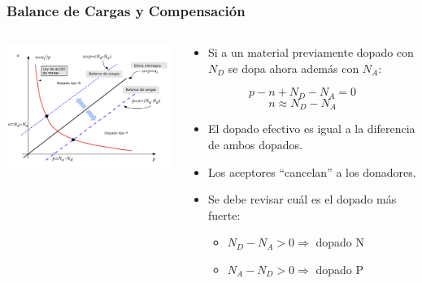 \documentclass[10pt,t,aspectratio=169]{beamer}
\begin{document}
\begin{frame}[t]
  \frametitle{Balance de Cargas y Compensación}

  \begin{columns}
    \begin{column}{0.6\textwidth}
      \includegraphics[width=9.5cm]{./figures/curvanvsp2.png}      
    \end{column}
    \begin{column}{0.4\textwidth}
      \begin{itemize}
        \item Si a un material previamente dopado con $N_D$ se dopa ahora además con $N_A$:
      \end{itemize}
      \[ p - n + N_D - N_A = 0 \]
      \[ n \approx N_D - N_A \]
      \begin{itemize}
        \item El dopado efectivo es igual a la diferencia de ambos dopados.
        \item Los aceptores ``cancelan'' a los donadores.
        \item Se debe revisar cuál es el dopado más fuerte:
        \begin{itemize}
          \item $N_D-N_A>0 \Rightarrow$ dopado N
          \item $N_A-N_D>0 \Rightarrow$ dopado P
        \end{itemize}
      \end{itemize}
    \end{column}
  \end{columns}
\end{frame}
\end{document}
